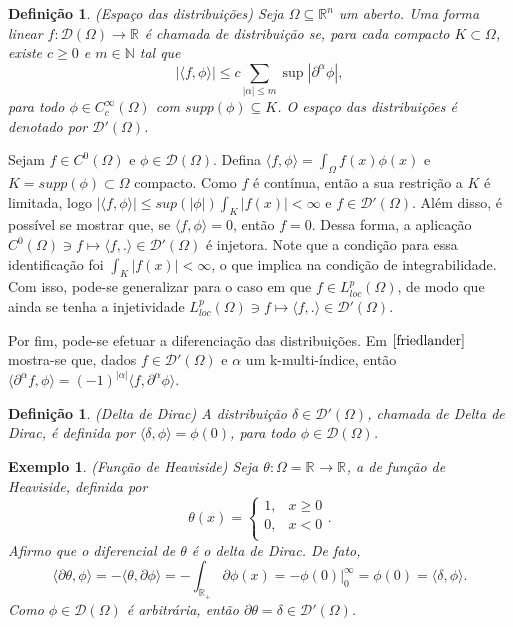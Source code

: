 \documentclass[12pt]{book}
\newtheorem{definicao}[teorema]{Definição}
\newtheorem{exemplo}[teorema]{Exemplo}
\newcommand{\distribuicoes}{\distribuicoesgeral{\Omega}}
\newcommand{\distribuicoesgeral}[1]{\mathcal{D'}(#1)}
\newcommand{\espacoLpcomp}[1]{L^{p}_{loc}(#1)}
\newcommand{\funcaocond}[5]{
	#1 = 
	\left\{
	\begin{array}{cc}
		#2, & #3\\
		#4, & #5\\
	\end{array}
	\right.
}
\newcommand{\funcoesdiferenciaveis}[2]{C^{#1}(#2)}
\newcommand{\funcoesdiferenciaveissupp}[2]{C^{#1}_{c}(#2)}
\newcommand{\funcoesteste}{\mathcal{D}(\Omega)}
\newcommand{\produtointerno}[2]{\langle #1, #2 \rangle}
\newcommand{\real}[1]{\mathbb{R}^{#1}}
\newcommand{\reta}{\real{}}
\begin{document}
	\begin{definicao}
		(Espaço das distribuições) Seja $\Omega \subseteq \real{n}$ um aberto. Uma forma linear $f:\funcoesteste \to \reta$ é chamada de distribuição se, para cada compacto $K\subset \Omega$, existe $c\geq 0$ e $m \in \mathbb{N}$ tal que 
		$$
		|\produtointerno{f}{\phi}| \leq c \sum_{|\alpha|\leq m} \sup|\partial^{\alpha}\phi|,
		$$
		para todo $\phi \in \funcoesdiferenciaveissupp{\infty}{\Omega}$ com $supp (\phi) \subseteq K$. O espaço das distribuições é denotado por $\distribuicoes$.
	\end{definicao}
	
	Sejam $f \in \funcoesdiferenciaveis{0}{\Omega}$ e $\phi \in \funcoesteste$. Defina $\produtointerno{f}{\phi}=\int_{\Omega}f(x)\phi(x)$ e $K = supp(\phi) \subset \Omega$ compacto. Como $f$ é contínua, então a sua restrição a $K$ é limitada, logo $|\produtointerno{f}{\phi}|\leq sup(|\phi|)\int_{K}|f(x)|<\infty$ e $f \in \distribuicoes$. Além disso, é possível se mostrar que, se $\produtointerno{f}{\phi}= 0$, então $f=0$. Dessa forma, a aplicação $\funcoesdiferenciaveis{0}{\Omega}\ni f \mapsto \produtointerno{f}{.} \in \distribuicoes$ é injetora. Note que a condição para essa identificação foi $\int_{K}|f(x)|<\infty$, o que implica na condição de integrabilidade. Com isso, pode-se generalizar para o caso em que $f \in \espacoLpcomp{\Omega}$, de modo que ainda se tenha a injetividade $\espacoLpcomp{\Omega} \ni f \mapsto \produtointerno{f}{.} \in \distribuicoes$.
	
	Por fim, pode-se efetuar a diferenciação das distribuições. Em $\cite{friedlander}$ mostra-se que, dados $f \in \distribuicoes$ e $\alpha$ um k-multi-índice, então $\produtointerno{\partial^{\alpha}f}{\phi} = (-1)^{|\alpha|}\produtointerno{f}{\partial^{\alpha}\phi}$.
	
	\begin{definicao}
		(Delta de Dirac) A distribuição $\delta \in \distribuicoes$, chamada de Delta de Dirac, é definida por $\produtointerno{\delta}{\phi} = \phi(0)$, para todo $\phi \in \funcoesteste$.
	\end{definicao}
	
	\begin{exemplo}
		(Função de Heaviside) Seja $\theta:\Omega = \reta \to \reta$, a de função de Heaviside, definida por
		$$
		\funcaocond{\theta(x)}{1}{x\geq0}{0}{x<0}.
		$$
		Afirmo que o diferencial de $\theta$ é o delta de Dirac. De fato,
		$$
		\produtointerno{\partial\theta}{\phi} = -		\produtointerno{\theta}{\partial\phi} = -\int_{\reta_{+}}\partial \phi(x) = -\phi(0)\Big|^{\infty}_{0} = \phi(0) = \produtointerno{\delta}{\phi}.
		$$
		Como $\phi \in \funcoesteste$ é arbitrária, então $\partial \theta = \delta \in \distribuicoes$.
	\end{exemplo}
	
\end{document}
